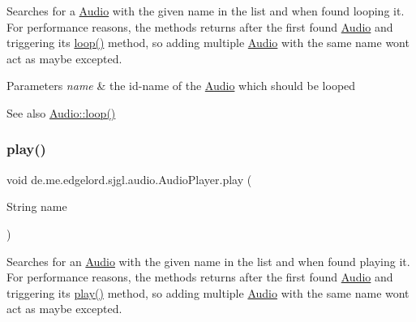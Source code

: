 Searches for a {\ttfamily \mbox{\hyperlink{classde_1_1me_1_1edgelord_1_1sjgl_1_1audio_1_1_audio}{Audio}}} with the given name in the list and when found looping it. For performance reasons, the methods returns after the first found {\ttfamily \mbox{\hyperlink{classde_1_1me_1_1edgelord_1_1sjgl_1_1audio_1_1_audio}{Audio}}} and triggering its {\ttfamily \mbox{\hyperlink{classde_1_1me_1_1edgelord_1_1sjgl_1_1audio_1_1_audio_player_a4773c3bc2054fcb5f7892ebf330c68b8}{loop()}}} method, so adding multiple {\ttfamily \mbox{\hyperlink{classde_1_1me_1_1edgelord_1_1sjgl_1_1audio_1_1_audio}{Audio}}} with the same name won\textquotesingle{}t act as maybe excepted.


\begin{DoxyParams}{Parameters}
{\em name} & the id-\/name of the {\ttfamily \mbox{\hyperlink{classde_1_1me_1_1edgelord_1_1sjgl_1_1audio_1_1_audio}{Audio}}} which should be looped\\
\hline
\end{DoxyParams}
\begin{DoxySeeAlso}{See also}
\mbox{\hyperlink{classde_1_1me_1_1edgelord_1_1sjgl_1_1audio_1_1_audio_a654692b8ee1f0d298af938b2c76e6a54}{Audio\+::loop()}} 
\end{DoxySeeAlso}
\mbox{\label{classde_1_1me_1_1edgelord_1_1sjgl_1_1audio_1_1_audio_player_aecce0a524758259586949e7fb0c477d6}} 
\subsubsection{\texorpdfstring{play()}{play()}}
{\footnotesize\ttfamily void de.\+me.\+edgelord.\+sjgl.\+audio.\+Audio\+Player.\+play (\begin{DoxyParamCaption}\item[{String}]{name }\end{DoxyParamCaption})}

Searches for an {\ttfamily \mbox{\hyperlink{classde_1_1me_1_1edgelord_1_1sjgl_1_1audio_1_1_audio}{Audio}}} with the given name in the list and when found playing it. For performance reasons, the methods returns after the first found {\ttfamily \mbox{\hyperlink{classde_1_1me_1_1edgelord_1_1sjgl_1_1audio_1_1_audio}{Audio}}} and triggering its {\ttfamily \mbox{\hyperlink{classde_1_1me_1_1edgelord_1_1sjgl_1_1audio_1_1_audio_player_aecce0a524758259586949e7fb0c477d6}{play()}}} method, so adding multiple {\ttfamily \mbox{\hyperlink{classde_1_1me_1_1edgelord_1_1sjgl_1_1audio_1_1_audio}{Audio}}} with the same name won\textquotesingle{}t act as maybe excepted.


